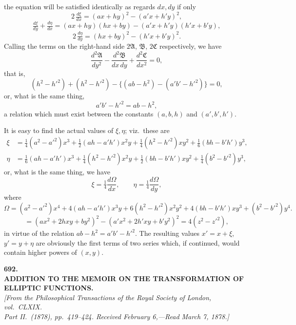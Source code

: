 \documentclass[11pt]{article}
\begin{document}
\noindent the equation will be satisfied identically as regards $dx, dy$ if only
\[
2\,\tfrac{d\xi}{dx} = (ax + hy)^{2} - (a'x + h'y)^{2},
\]
\[
\tfrac{d\xi}{dy} + \tfrac{d\eta}{dx} = (ax + hy)(hx + by) - (a'x + h'y)(h'x + b'y),
\]
\[
2\,\tfrac{d\eta}{dy} = (hx + by)^{2} - (h'x + b'y)^{2}.
\]
Calling the terms on the right-hand side $2\mathfrak{A}$, $\mathfrak{B}$, $2\mathfrak{C}$ respectively, we have
\[
\frac{d^{2}\mathfrak{A}}{dy^{2}} - \frac{d^{2}\mathfrak{B}}{dx\,dy} + \frac{d^{2}\mathfrak{C}}{dx^{2}} = 0,
\]
that is,
\[
(h^{2} - h'^{2}) + (h^{2} - h'^{2}) - \{(ab - h^{2}) - (a'b' - h'^{2})\} = 0,
\]
or, what is the same thing,
\[
a'b' - h'^{2} = ab - h^{2},
\]
a relation which must exist between the constants $(a, b, h)$ and $(a', b', h')$.

It is easy to find the actual values of $\xi, \eta$; viz.\ these are
\begin{align*}
\xi &= \tfrac{1}{4}(a^{2} - a'^{2})x^{3} + \tfrac{1}{2}(ah - a'h')x^{2}y + \tfrac{1}{4}(h^{2} - h'^{2})xy^{2} + \tfrac{1}{6}(bh - b'h')y^{3},\\
\eta &= \tfrac{1}{6}(ah - a'h')x^{3} + \tfrac{1}{4}(h^{2} - h'^{2})x^{2}y + \tfrac{1}{2}(bh - b'h')xy^{2} + \tfrac{1}{4}(b^{2} - b'^{2})y^{3},
\end{align*}
or, what is the same thing, we have
\[
\xi = \tfrac{1}{4}\frac{d\Omega}{dx}, \qquad \eta = \tfrac{1}{4}\frac{d\Omega}{dy},
\]
where
\[
\Omega = (a^{2} - a'^{2})x^{4} + 4(ah - a'h')x^{3}y + 6(h^{2} - h'^{2})x^{2}y^{2} + 4(bh - b'h')xy^{3} + (b^{2} - b'^{2})y^{4}.
\]
\[
= (ax^{2} + 2hxy + by^{2})^{2} - (a'x^{2} + 2h'xy + b'y^{2})^{2} = 4(z^{2} - z'^{2}),
\]
in virtue of the relation $ab - h^{2} = a'b' - h'^{2}$. The resulting values $x' = x + \xi$, $y' = y + \eta$ are obviously the first terms of two series which, if continued, would contain higher powers of $(x, y)$.

\bigskip


\begin{center}
{\Large\bfseries 692.}\\[8pt]
{\large\bfseries ADDITION TO THE MEMOIR ON THE TRANSFORMATION OF\\ ELLIPTIC FUNCTIONS.}\\[6pt]
\textit{[From the Philosophical Transactions of the Royal Society of London, vol.~CLXIX.\\
Part II.\ (1878), pp.~419--424. Received February 6,---Read March 7, 1878.]}
\end{center}
\end{document}
